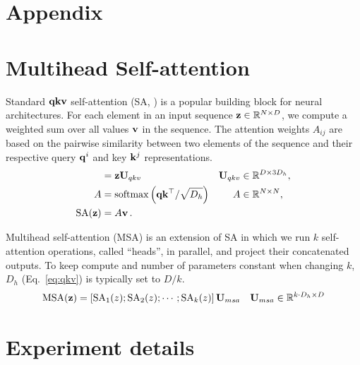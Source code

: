 \appendix
\section*{Appendix}

\section{Multihead Self-attention}
\label{sec:self_attention}
Standard $\mathbf{qkv}$ self-attention (SA, \citet{vaswani2017}) is a popular building block for neural architectures. For each element in an input sequence $\mathbf{z} \in \mathbb{R}^{N \times D}$, we compute a weighted sum over all values $\mathbf{v}$ in the sequence. The attention weights $A_{ij}$ are based on the pairwise similarity between two elements of the sequence and their respective query $\mathbf{q}^i$ and key $\mathbf{k}^j$ representations.
\begin{align}
    [\mbf{q}, \mbf{k}, \mbf{v}] &= \mbf{z} \mbf{U}_{qkv}
    & \mbf{U}_{qkv} &\in \mathbb{R}^{D \times 3 D_h} , \label{eq:qkv} \\
    A &= \op{softmax}\left(\mbf{q}\mbf{k}^\top / \sqrt{D_h}\right)
    & A &\in \mathbb{R}^{N \times N} , \label{eq:attn_matrix}\\
    \op{SA}(\mbf{z}) &= A\mbf{v}\,. \label{eq:selfattn}
\end{align}

Multihead self-attention (MSA) is an extension of SA in which we run $k$ self-attention operations, called ``heads'', in parallel, and project their concatenated outputs. To keep compute and number of parameters constant when changing $k$, $D_h$ (Eq.~\ref{eq:qkv}) is typically set to $D/k$.
\begin{align}
    \operatorname{MSA}(\mathbf{z}) &= [\operatorname{SA}_1(z); \operatorname{SA}_2(z); \cdots ; \operatorname{SA}_k(z)] \, \mathbf{U}_{msa} & \mathbf{U}_{msa} \in \mathbb{R}^{k \cdot D_h \times D} \label{eq:msa}
\end{align}

\section{Experiment details}

